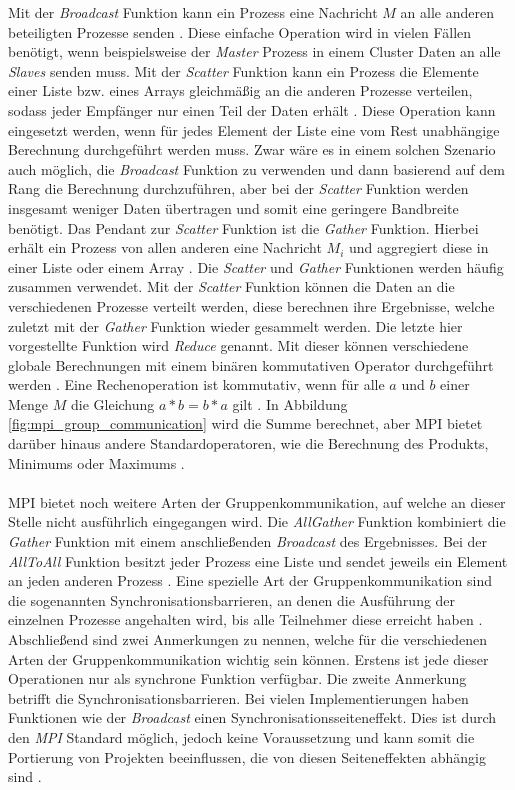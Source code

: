 Mit der \emph{Broadcast} Funktion kann ein Prozess eine Nachricht $M$ an alle anderen beteiligten Prozesse senden \cite{dongarra1995introduction}. Diese einfache Operation wird in vielen Fällen benötigt, wenn beispielsweise der \emph{Master} Prozess in einem Cluster Daten an alle \emph{Slaves} senden muss. Mit der \emph{Scatter} Funktion kann ein Prozess die Elemente einer Liste bzw. eines Arrays gleichmäßig an die anderen Prozesse verteilen, sodass jeder Empfänger nur einen Teil der Daten erhält \cite{nielsen2016introduction}. Diese Operation kann eingesetzt werden, wenn für jedes Element der Liste eine vom Rest unabhängige Berechnung durchgeführt werden muss. Zwar wäre es in einem solchen Szenario auch möglich, die \emph{Broadcast} Funktion zu verwenden und dann basierend auf dem Rang die Berechnung durchzuführen, aber bei der \emph{Scatter} Funktion werden insgesamt weniger Daten übertragen und somit eine geringere Bandbreite benötigt. Das Pendant zur \emph{Scatter} Funktion ist die \emph{Gather} Funktion. Hierbei erhält ein Prozess von allen anderen eine Nachricht $M_i$ und aggregiert diese in einer Liste oder einem Array \cite{nielsen2016introduction}. Die \emph{Scatter} und \emph{Gather} Funktionen werden häufig zusammen verwendet. Mit der \emph{Scatter} Funktion können die Daten an die verschiedenen Prozesse verteilt werden, diese berechnen ihre Ergebnisse, welche zuletzt mit der \emph{Gather} Funktion wieder gesammelt werden. Die letzte hier vorgestellte Funktion wird \emph{Reduce} genannt. Mit dieser können verschiedene globale Berechnungen mit einem binären kommutativen Operator durchgeführt werden \cite{nielsen2016introduction}. Eine Rechenoperation ist kommutativ, wenn für alle $a$ und $b$ einer Menge $M$  die Gleichung $a*b=b*a$ gilt \cite{walz2011brueckenkurs}. In Abbildung \ref{fig:mpi_group_communication} wird die Summe berechnet, aber \ac{MPI} bietet darüber hinaus andere Standardoperatoren, wie die Berechnung des Produkts, Minimums oder Maximums \cite{nielsen2016introduction}. 
\\\\
\ac{MPI} bietet noch weitere Arten der Gruppenkommunikation, auf welche an dieser Stelle nicht ausführlich eingegangen wird. Die \emph{AllGather} Funktion kombiniert die \emph{Gather} Funktion mit einem anschließenden \emph{Broadcast} des Ergebnisses. Bei der \emph{AllToAll} Funktion besitzt jeder Prozess eine Liste und sendet jeweils ein Element an jeden anderen Prozess \cite{dongarra1995introduction}. Eine spezielle Art der Gruppenkommunikation sind die sogenannten Synchronisationsbarrieren, an denen die Ausführung der einzelnen Prozesse angehalten wird, bis alle Teilnehmer diese erreicht haben \cite{nielsen2016introduction}. Abschließend sind zwei Anmerkungen zu nennen, welche für die verschiedenen Arten der Gruppenkommunikation wichtig sein können. Erstens ist jede dieser Operationen nur als synchrone Funktion verfügbar. Die zweite Anmerkung betrifft die Synchronisationsbarrieren. Bei vielen Implementierungen haben Funktionen wie der \emph{Broadcast} einen Synchronisationsseiteneffekt. Dies ist durch den \emph{MPI} Standard möglich, jedoch keine Voraussetzung und kann somit die Portierung von Projekten beeinflussen, die von diesen Seiteneffekten abhängig sind \cite{dongarra1995introduction}.

